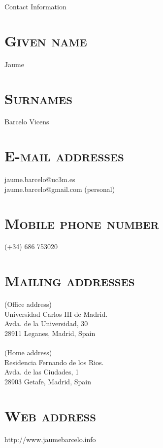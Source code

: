 \documentclass[line,margin]{res}
\begin{document}
{\huge Contact Information}

\section{\textsc{Given name}}
Jaume

\section{\textsc{Surnames}}
Barcelo Vicens

%
%
\section{\textsc{E-mail addresses}}
jaume.barcelo@uc3m.es \\
jaume.barcelo@gmail.com (personal)

\section{\textsc{Mobile phone number}}
(+34) 686 753020 \\

\section{\textsc{Mailing addresses}}
%
(Office address) \\
Universidad Carlos III de Madrid.\\
Avda. de la Universidad, 30\\
28911 Leganes, Madrid, Spain\\
 \\
(Home address) \\
Residencia Fernando de los Rios.\\
Avda. de las Ciudades, 1\\
28903 Getafe, Madrid, Spain\\

\section{\textsc{Web address}}
http://www.jaumebarcelo.info
\end{document}

